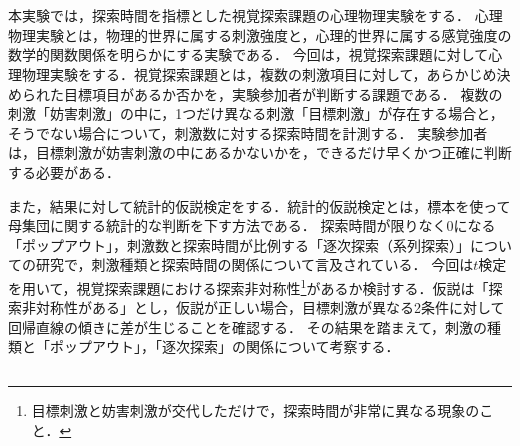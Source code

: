 \chapter{\kadaib}\label{chap:\kadaib}
\section{\purpose}
本実験では，探索時間を指標とした視覚探索課題の心理物理実験をする．
心理物理実験とは，物理的世界に属する刺激強度と，心理的世界に属する感覚強度の数学的関数関係を明らかにする実験である\cite{心理物理測定法}．
今回は，視覚探索課題に対して心理物理実験をする．視覚探索課題とは，複数の刺激項目に対して，あらかじめ決められた目標項目があるか否かを，実験参加者が判断する課題である\cite{視覚探索}．
複数の刺激「妨害刺激」の中に，1つだけ異なる刺激「目標刺激」が存在する場合と，そうでない場合について，刺激数に対する探索時間を計測する．
実験参加者は，目標刺激が妨害刺激の中にあるかないかを，できるだけ早くかつ正確に判断する必要がある．\par
また，結果に対して統計的仮説検定をする．統計的仮説検定とは，標本を使って母集団に関する統計的な判断を下す方法である\cite[p.200]{Pythonで学ぶあたらしい統計学の教科書}．
探索時間が限りなく\(0\)になる「ポップアウト」，刺激数と探索時間が比例する「逐次探索（系列探索）」についての研究\cite{視覚探索課題と注意に関する研究動向}で，刺激種類と探索時間の関係について言及されている．
今回は\(t\)検定を用いて，視覚探索課題における探索非対称性\footnote{目標刺激と妨害刺激が交代しただけで，探索時間が非常に異なる現象のこと\cite{4視覚探索}．}があるか検討する．仮説は「探索非対称性がある」とし，仮説が正しい場合，目標刺激が異なる2条件に対して回帰直線の傾きに差が生じることを確認する．
その結果を踏まえて，刺激の種類と「ポップアウト」，「逐次探索」の関係について考察する．
\section{\method}
